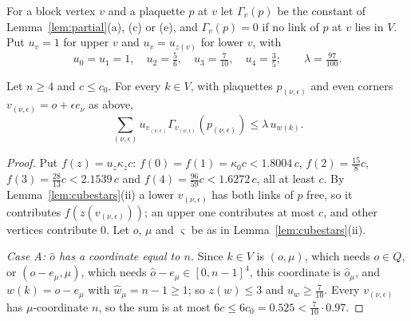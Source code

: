 For a block vertex $v$ and a plaquette $p$ at $v$ let $\Gamma_v(p)$ be the
constant of Lemma~\ref{lem:partial}(a), (c) or (e), and $\Gamma_v(p)=0$ if no
link of $p$ at $v$ lies in $V$. Put $u_v=1$ for upper $v$ and $u_v=u_{z(v)}$
for lower $v$, with
\[
u_0=u_1=1,\quad u_2=\tfrac56,\quad u_3=\tfrac7{10},\quad u_4=\tfrac35;
\qquad\lambda=\tfrac{97}{100}.
\]

\begin{lemma}\label{lem:column}
Let $n\ge4$ and $c\le c_0$. For every $k\in V$, with plaquettes
$p_{(\nu,\epsilon)}$ and even corners $v_{(\nu,\epsilon)}=o+\epsilon e_\nu$ as
above,
\[
\sum_{(\nu,\epsilon)}u_{v_{(\nu,\epsilon)}}\Gamma_{v_{(\nu,\epsilon)}}
(p_{(\nu,\epsilon)})\le\lambda\,u_{w(k)} .
\]
\end{lemma}

\begin{proof}
Put $f(z)=u_z\kappa_zc$: $f(0)=f(1)=\kappa_0c<1.8004\,c$, $f(2)=\frac{15}8c$,
$f(3)=\frac{28}{13}c<2.1539\,c$ and $f(4)=\frac{96}{59}c<1.6272\,c$, all at
least $c$. By Lemma~\ref{lem:cubestars}(ii) a lower $v_{(\nu,\epsilon)}$ has
both links of $p$ free, so it contributes $f(z(v_{(\nu,\epsilon)}))$; an upper
one contributes at most $c$, and other vertices contribute $0$. Let $o$, $\mu$
and $\varsigma$ be as in Lemma~\ref{lem:cubestars}(ii).

\emph{Case A: $\hat o$ has a coordinate equal to $n$.} Since $k\in V$ is
$(o,\mu)$, which needs $o\in Q$, or $(o-e_\mu,\mu)$, which needs $\hat o-e_\mu
\in[0,n-1]^4$, this coordinate is $\hat o_\mu$, and $w(k)=o-e_\mu$ with
$\hat w_\mu=n-1\ge1$; so $z(w)\le3$ and $u_w\ge\frac7{10}$. Every
$v_{(\nu,\epsilon)}$ has $\mu$-coordinate $n$, so the sum is at most
$6c\le6c_0=0.525<\frac7{10}\cdot0.97$.


\end{proof}

